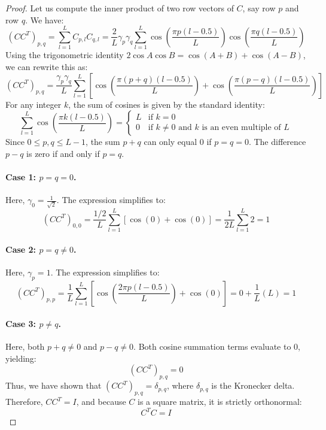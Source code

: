 \documentclass{article}
\theoremstyle{plain}
\theoremstyle{definition}
\theoremstyle{remark}
\begin{document}
\begin{proof}
Let us compute the inner product of two row vectors of $C$, say row $p$ and row $q$. We have:
\begin{equation}
    (C C^T)_{p,q} = \sum_{l=1}^L C_{p,l} C_{q,l} = \frac{2}{L} \gamma_p \gamma_q \sum_{l=1}^L \cos\left( \frac{\pi p (l - 0.5)}{L} \right) \cos\left( \frac{\pi q (l - 0.5)}{L} \right)
\end{equation}
Using the trigonometric identity $2 \cos A \cos B = \cos(A+B) + \cos(A-B)$, we can rewrite this as:
\begin{equation}
    (C C^T)_{p,q} = \frac{\gamma_p \gamma_q}{L} \sum_{l=1}^L \left[ \cos\left( \frac{\pi (p+q) (l - 0.5)}{L} \right) + \cos\left( \frac{\pi (p-q) (l - 0.5)}{L} \right) \right]
\end{equation}
For any integer $k$, the sum of cosines is given by the standard identity:
\begin{equation}
    \sum_{l=1}^L \cos\left( \frac{\pi k (l - 0.5)}{L} \right) = \begin{cases} L & \text{if } k = 0 \\ 0 & \text{if } k \neq 0 \text{ and } k \text{ is an even multiple of } L \end{cases}
\end{equation}
Since $0 \le p, q \le L-1$, the sum $p+q$ can only equal $0$ if $p=q=0$. The difference $p-q$ is zero if and only if $p=q$.
\paragraph{Case 1: $p = q = 0$.} Here, $\gamma_0 = \frac{1}{\sqrt{2}}$. The expression simplifies to:
\begin{equation}
    (C C^T)_{0,0} = \frac{1/2}{L} \sum_{l=1}^L \left[ \cos(0) + \cos(0) \right] = \frac{1}{2L} \sum_{l=1}^L 2 = 1
\end{equation}
\paragraph{Case 2: $p = q \neq 0$.} Here, $\gamma_p = 1$. The expression simplifies to:
\begin{equation}
    (C C^T)_{p,p} = \frac{1}{L} \sum_{l=1}^L \left[ \cos\left( \frac{2 \pi p (l - 0.5)}{L} \right) + \cos(0) \right] = 0 + \frac{1}{L}(L) = 1
\end{equation}
\paragraph{Case 3: $p \neq q$.} Here, both $p+q \neq 0$ and $p-q \neq 0$. Both cosine summation terms evaluate to 0, yielding:
\begin{equation}
    (C C^T)_{p,q} = 0
\end{equation}
Thus, we have shown that $(C C^T)_{p,q} = \delta_{p,q}$, where $\delta_{p,q}$ is the Kronecker delta. Therefore, $C C^T = I$, and because $C$ is a square matrix, it is strictly orthonormal:
\begin{equation}
    C^T C = I
\end{equation}
\end{proof}
\end{document}
